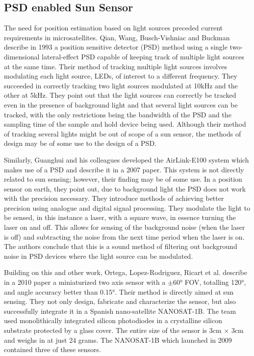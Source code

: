\subsection{PSD enabled Sun Sensor}
The need for position estimation based on light sources preceded current requirements in microsatellites. Qian, Wang, Busch-Vishniac and Buckman describe in 1993 a position sensitive detector (PSD) method using a single two-dimensional lateral-effect PSD capable of keeping track of multiple light sources at the same time. Their method of tracking multiple light sources involves modulating each light source, LEDs, of interest to a different frequency. They succeeded in correctly tracking two light sources modulated at 10kHz and the other at 5kHz. They point out that the light sources can correctly be tracked even in the presence of background light and that several light sources can be tracked, with the only restrictions being the bandwidth of the PSD and the sampling time of the sample and hold device being used. Although their method of tracking several lights might be out of scope of a sun sensor, the methods of design may be of some use to the design of a PSD. 

Similarly, Guanghui and his colleagues developed the AirLink-E100 system which makes use of a PSD and describe it in a 2007 paper. This system is not directly related to sun sensing; however, their finding may be of some use. In a position sensor on earth, they point out, due to background light the PSD does not work with the precision necessary. They introduce methods of achieving better precision using analogue and digital signal processing. They modulate the light to be sensed, in this instance a laser, with a square wave, in essence turning the laser on and off. This allows for sensing of the background noise (when the laser is off) and subtracting the noise from the next time period when the laser is on. The authors conclude that this is a sound method of filtering out background noise in PSD devices where the light source can be modulated.

Building on this and other work, Ortega, Lopez-Rodriguez, Ricart et al. describe in a 2010 paper a miniaturized two axis sensor with a $\pm$60° FOV, totalling 120°, and angle accuracy better than 0.15°. Their method is directly aimed at sun sensing. They not only design, fabricate and characterize the sensor, but also successfully integrate it in a Spanish nano-satellite NANOSAT-1B. The team used monolithically integrated silicon photodiodes in a crystalline silicon substrate protected by a glass cover. The entire size of the sensor is 3cm $\times$ 3cm and weighs in at just 24 grams. The NANOSAT-1B which launched in 2009 contained three of these sensors. 

